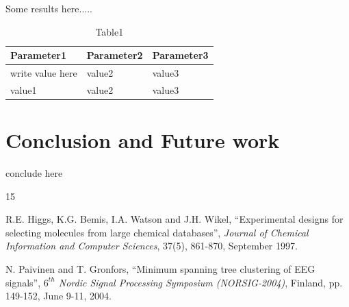\documentclass[a4paper,12pt]{report}
\begin{document}
Some results here.....

\begin{table}[ht]
\centering
\caption{Table1}
\label{my-label}
\begin{tabular}{|l|l|l|}
\hline
Parameter1 & Parameter2 & Parameter3 \\ \hline
write value here & value2 & value3 \\ \hline
value1 & value2 & value3 \\ \hline
\end{tabular}
\end{table}

\chapter{Conclusion and Future work}
conclude here




\begin{thebibliography}{15}


 R.E. Higgs, K.G. Bemis, I.A. Watson and J.H. Wikel, “Experimental designs for selecting molecules from large chemical databases”, \textit{Journal of Chemical Information and Computer Sciences}, 37(5), 861-870, September 1997.

 N. Paivinen and T. Gronfors, “Minimum spanning tree clustering of EEG signals”, \textit{$6^{th}$ Nordic Signal Processing Symposium (NORSIG-2004)}, Finland, pp. 149-152, June 9-11, 2004.



  
\end{thebibliography}
\pagebreak 
\end{document}
